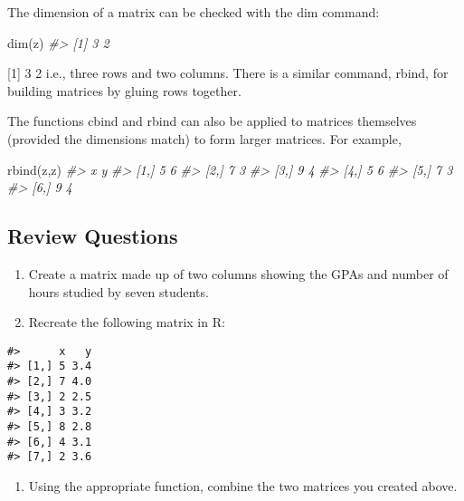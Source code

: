 \documentclass[
]{book}
\newenvironment{Shaded}{\begin{snugshade}}{\end{snugshade}}
\newcommand{\CommentTok}[1]{\textcolor[rgb]{0.56,0.35,0.01}{\textit{#1}}}
\newcommand{\FunctionTok}[1]{\textcolor[rgb]{0.00,0.00,0.00}{#1}}
\newcommand{\NormalTok}[1]{#1}
\providecommand{\tightlist}{%
  \setlength{\itemsep}{0pt}\setlength{\parskip}{0pt}}
\begin{document}
The dimension of a matrix can be checked with the dim command:

\begin{Shaded}
\begin{Highlighting}[]
\FunctionTok{dim}\NormalTok{(z)}
\CommentTok{\#\textgreater{} [1] 3 2}
\end{Highlighting}
\end{Shaded}

{[}1{]} 3 2 i.e., three rows and two columns. There is a similar command, rbind, for building matrices by gluing rows together.

The functions cbind and rbind can also be applied to matrices themselves (provided the dimensions match) to form larger matrices. For example,

\begin{Shaded}
\begin{Highlighting}[]
\FunctionTok{rbind}\NormalTok{(z,z)}
\CommentTok{\#\textgreater{}      x y}
\CommentTok{\#\textgreater{} [1,] 5 6}
\CommentTok{\#\textgreater{} [2,] 7 3}
\CommentTok{\#\textgreater{} [3,] 9 4}
\CommentTok{\#\textgreater{} [4,] 5 6}
\CommentTok{\#\textgreater{} [5,] 7 3}
\CommentTok{\#\textgreater{} [6,] 9 4}
\end{Highlighting}
\end{Shaded}

\hypertarget{review-questions}{%
\subsection{Review Questions}\label{review-questions}}

\begin{enumerate}
\def\labelenumi{\arabic{enumi})}
\item
  Create a matrix made up of two columns showing the GPAs and number of hours studied by seven students.
\item
  Recreate the following matrix in R:
\end{enumerate}

\begin{verbatim}
#>      x   y
#> [1,] 5 3.4
#> [2,] 7 4.0
#> [3,] 2 2.5
#> [4,] 3 3.2
#> [5,] 8 2.8
#> [6,] 4 3.1
#> [7,] 2 3.6
\end{verbatim}

\begin{enumerate}
\def\labelenumi{\arabic{enumi})}
\setcounter{enumi}{2}
\tightlist
\item
  Using the appropriate function, combine the two matrices you created above.
\end{enumerate}
\end{document}
